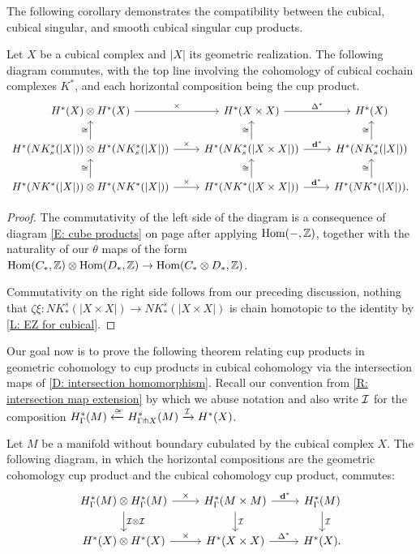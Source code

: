 \documentclass{amsart}
\begin{document}
The following corollary demonstrates the compatibility between the cubical, cubical singular, and smooth cubical singular cup products.

\begin{corollary}
	Let $X$ be a cubical complex and $|X|$ its geometric realization.
	The following diagram commutes, with the top line involving the cohomology of cubical cochain complexes $K^*$, and each horizontal composition being the cup product.
	\[
	\begin{tikzcd}
	H^*(X) \otimes H^*(X) \arrow[r,"\times"]& H^*(X \times X) \arrow[r,"\Delta^*"] & H^*(X)\\
	H^*(NK^*_s(|X|)) \otimes H^*(NK^*_s(|X|)) \arrow[r,"\times"]\arrow[u,"\cong"] & H^*(NK^*_s(|X \times X|)) \arrow[r,"\diag^*"]\arrow[u,"\cong"] & H^*(NK^*_s(|X|))\arrow[u,"\cong"]\\
	H^*(NK^*(|X|)) \otimes H^*(NK^*(|X|))\arrow[r,"\times"]\arrow[u,"\cong"] & H^*(NK^*(|X \times X|)) \arrow[u,"\cong"]\arrow[r,"\diag^*"] &H^*(NK^*(|X|))\arrow[u,"\cong"].
	\end{tikzcd}
	\]
\end{corollary}
\begin{proof}
The commutativity of the left side of the diagram is a consequence of diagram \eqref{E: cube products} on page \pageref{E: cube products} after applying $\textup{Hom}(-,\mathbb{Z})$,  together with the naturality of our $\theta$ maps of the form $\textup{Hom}(C_*,\mathbb{Z}) \otimes \textup{Hom}(D_*,\mathbb{Z}) \to \textup{Hom}(C_* \otimes D_*,\mathbb{Z})$.

Commutativity on the right side follows from our preceding discussion, nothing that $\zeta \xi \colon NK_*^s(|X \times X|) \to NK_*^s(|X \times X|)$ is chain homotopic to the identity by \cref{L: EZ for cubical}.
\end{proof}


Our goal now is to prove the following theorem relating cup products in geometric cohomology to cup products in cubical cohomology via the intersection maps of \cref{D: intersection homomorphism}.
Recall our convention from \cref{R: intersection map extension} by which we abuse notation and also write $\mathcal{I}$ for the composition $H^*_\Gamma(M) \xleftarrow{\cong} H^*_{\Gamma \pitchfork X}(M) \xrightarrow{\mathcal{I}} H^*(X)$.

\begin{theorem}\label{T: cup compatibility}
Let $M$ be a manifold without boundary cubulated by the cubical complex $X$.
The following diagram, in which the horizontal compositions are the geometric cohomology cup product and the cubical cohomology cup product, commutes:
	\[
	\begin{tikzcd}
	H^*_\Gamma(M) \otimes H^*_\Gamma(M) \arrow[r,"\times"]\arrow[d,"\mc I \otimes \mc I"]& H^*_\Gamma(M \times M) \arrow[d,"\mc I"]\arrow[r,"\diag^*"] & H^*_\Gamma(M) \arrow[d,"\mc I"]\\
	H^*(X) \otimes H^*(X) \arrow[r,"\times"]& H^*(X \times X) \arrow[r,"\Delta^*"] & H^*(X).
	\end{tikzcd}
	\]
\end{theorem}
\end{document}

